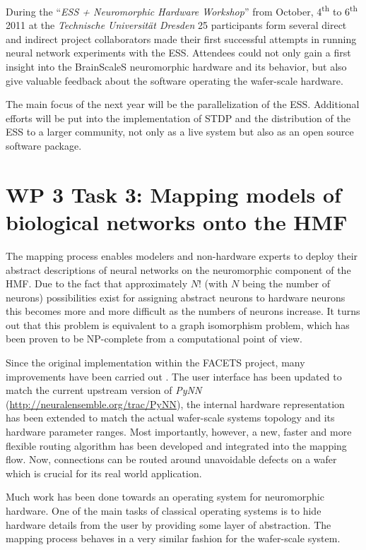 \documentclass[12pt,oneside]{scrartcl}
\begin{document}
During the ``\emph{ESS + Neuromorphic Hardware Workshop}'' from October, 4\textsuperscript{th} to 6\textsuperscript{th} 2011 at the \emph{Technische Universität Dresden} 25 participants form several direct and indirect project collaborators made their first successful attempts in running neural network experiments with the ESS.
%
Attendees could not only gain a first insight into the BrainScaleS neuromorphic hardware and its behavior, but also give valuable feedback about the software operating the wafer-scale hardware.

The main focus of the next year will be the parallelization of the ESS.
Additional efforts will be put into the implementation of STDP and the distribution of the ESS to a larger community, not only as a live system but also as an open source software package.

\section*{WP 3 Task 3: Mapping models of biological networks onto the HMF}

The mapping process enables modelers and non-hardware experts to deploy their abstract descriptions of neural networks on the neuromorphic component of the HMF.
%
Due to the fact that approximately $N!$ (with $N$ being the number of neurons) possibilities exist for assigning abstract neurons to hardware neurons this becomes more and more difficult as the numbers of neurons increase.
%
It turns out that this problem is equivalent to a graph isomorphism problem, which has been proven to be NP-complete from a computational point of view.

Since the original implementation within the FACETS project, many improvements have been carried out \citep{BRUE11}.
%
The user interface has been updated to match the current upstream version of \emph{PyNN} (\url{http://neuralensemble.org/trac/PyNN}), the internal hardware representation has been extended to match the actual wafer-scale systems topology and its hardware parameter ranges.
%
Most importantly, however, a new, faster and more flexible routing algorithm has been developed and integrated into the mapping flow.
%
Now, connections can be routed around unavoidable defects on a  wafer which is crucial for its real world application.

Much work has been done towards an operating system for neuromorphic hardware.
%
One of the main tasks of classical operating systems is to hide hardware details from the user by providing some layer of abstraction.
%
The mapping process behaves in a  very similar fashion for the wafer-scale system.
\end{document}
